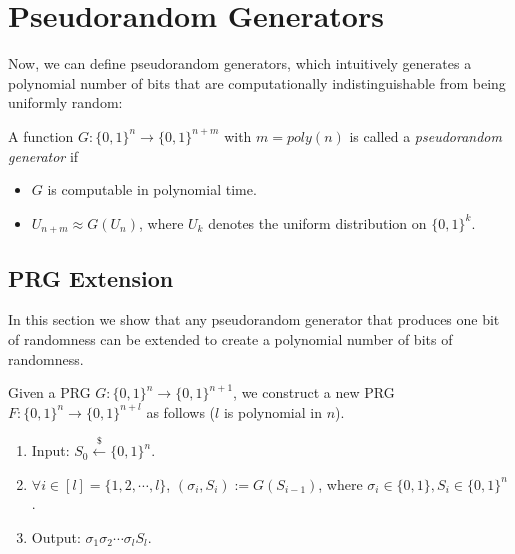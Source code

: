 \documentclass[12pt]{tufte-book}
\begin{document}
%
%
%
%
%
%
%
\fi

\section{Pseudorandom Generators}
Now, we can define pseudorandom generators, which intuitively generates a polynomial number of bits that are computationally indistinguishable from being uniformly random:
\begin{definition}
A function $G:\{0,1\}^n\rightarrow \{0,1\}^{n+m}$ with $m = poly(n)$ is called a \emph{pseudorandom generator} if
\begin{itemize}
\item $G$ is computable in polynomial time.
\item $U_{n+m}\approx G(U_n)$, where $U_k$ denotes the uniform distribution on $\{0,1\}^k$.
\end{itemize}
\end{definition}


\subsection{PRG Extension}
In this section we show that any pseudorandom generator that produces one bit of randomness can be extended to create a polynomial number of bits of randomness.

\begin{construction}
Given a PRG $G: \{0, 1\}^n \rightarrow \{0, 1\} ^ {n+1}$,
we construct a new PRG $F: \{0, 1\}^n \rightarrow \{0, 1\} ^{n+l}$ as follows ($l$ is polynomial in $n$).
\begin{enumerate}[label=(\alph*)]
    \item Input: $S_0 \xleftarrow{\$} \{0, 1\}^n$.
    \item $\forall i \in [l] = \{1, 2, \cdots, l\}$, $(\sigma_i, S_i) := G(S_{i-1})$, where $\sigma_i \in \{0, 1\}, S_i \in \{0, 1\}^n$ .
    \item Output: $\sigma_1 \sigma_2 \cdots \sigma_l S_l$.
\end{enumerate}
\end{construction}
\end{document}
